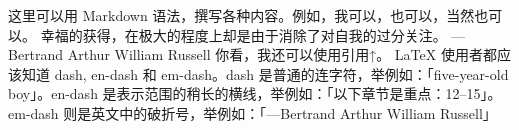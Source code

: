 \markdownRendererDocumentBegin
{}\markdownRendererInterblockSeparator
{}这里可以用 Markdown 语法，撰写各种内容。例如，我可以，也可以，当然也可以。\markdownRendererInterblockSeparator
{}\markdownRendererInterblockSeparator
{}\markdownRendererBlockQuoteBegin
幸福的获得，在极大的程度上却是由于消除了对自我的过分关注。 ---Bertrand Arthur William Russell
\markdownRendererBlockQuoteEnd \markdownRendererInterblockSeparator
{}你看，我还可以使用引用↑。\markdownRendererInterblockSeparator
{}\markdownRendererInterblockSeparator
{}LaTeX 使用者都应该知道 dash, en-dash 和 em-dash。dash 是普通的连字符，举例如：「five-year-old boy」。en-dash 是表示范围的稍长的横线，举例如：「以下章节是重点：12--15」。em-dash 则是英文中的破折号，举例如：「---Bertrand Arthur William Russell」\markdownRendererDocumentEnd
